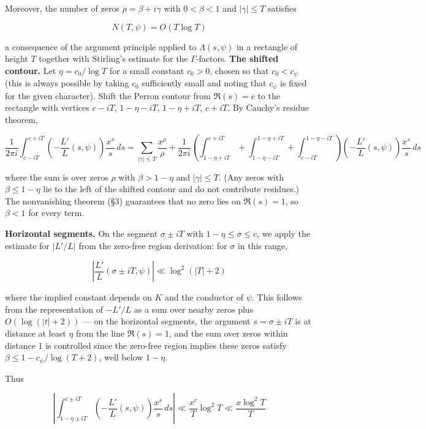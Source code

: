 \documentclass[12pt,a4paper]{article}
\newcommand{\pilcrow}{\S}
\begin{document}
Moreover, the number of zeros $\rho = \beta + i\gamma$ with $0 < \beta < 1$ and $|\gamma| \leq T$ satisfies

\[
N(T, \psi) = O(T \log T)
\]

a consequence of the argument principle applied to $\Lambda(s, \psi)$ in a rectangle of height $T$ together with Stirling's estimate for the $\Gamma$-factors.
\textbf{The shifted contour.} Let $\eta = c_0/\log T$ for a small constant $c_0 > 0$, chosen so that $c_0 < c_{\psi}$ (this is always possible by taking $c_0$ sufficiently small and noting that $c_{\psi}$ is fixed for the given character). Shift the Perron contour from $\Re(s) = c$ to the rectangle with vertices $c-iT$, $1-\eta-iT$, $1-\eta+iT$, $c+iT$. By Cauchy's residue theorem,

\[
\frac{1}{2\pi i} \int_{c-iT}^{c+iT} \left(-\frac{L'}{L}(s, \psi)\right) \frac{x^s}{s} \, ds = \sum_{|\gamma| \leq T} \frac{x^\rho}{\rho} + \frac{1}{2\pi i} \left( \int_{1-\eta+iT}^{c+iT} \!\!\! + \int_{1-\eta-iT}^{1-\eta+iT} \!\!\! + \int_{c-iT}^{1-\eta-iT} \right) \left(-\frac{L'}{L}(s, \psi)\right) \frac{x^s}{s} \, ds
\]

where the sum is over zeros $\rho$ with $\beta > 1-\eta$ and $|\gamma| \leq T$. (Any zeros with $\beta \leq 1-\eta$ lie to the left of the shifted contour and do not contribute residues.) The nonvanishing theorem (\pilcrow{}3) guarantees that no zero lies on $\Re(s)=1$, so $\beta < 1$ for every term.

\textbf{Horizontal segments.} On the segment $\sigma \pm iT$ with $1-\eta \leq \sigma \leq c$, we apply the estimate for $|L'/L|$ from the zero-free region derivation: for $\sigma$ in this range,

\[
\left|\frac{L'}{L}(\sigma \pm iT, \psi)\right| \ll \log^2(|T|+2)
\]

where the implied constant depends on $K$ and the conductor of $\psi$. This follows from the representation of $-L'/L$ as a sum over nearby zeros plus $O(\log(|t|+2))$ --- on the horizontal segments, the argument $s = \sigma \pm iT$ is at distance at least $\eta$ from the line $\Re(s)=1$, and the sum over zeros within distance 1 is controlled since the zero-free region implies these zeros satisfy $\beta \leq 1 - c_{\psi}/\log(T+2)$, well below $1-\eta$.

Thus

\[
\left| \int_{1-\eta \pm iT}^{c \pm iT} \left(-\frac{L'}{L}(s, \psi)\right) \frac{x^s}{s} \, ds \right| \ll \frac{x^c}{T} \log^2 T \ll \frac{x \log^2 T}{T}
\]
\end{document}
